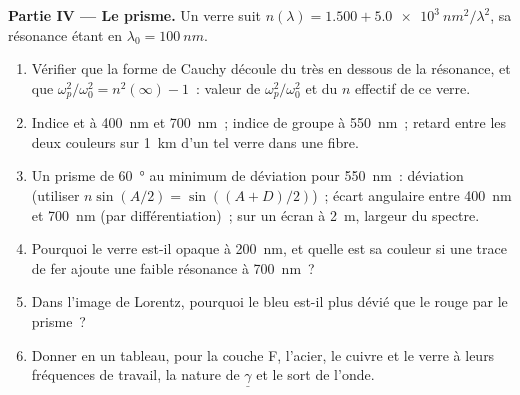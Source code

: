\begin{problem}
\medskip
\noindent\textbf{Partie IV --- Le prisme.}
Un verre suit $n(\lambda) = 1.500 + \qty{5.0e3}{nm^2}/\lambda^2$, sa résonance étant
en $\lambda_0 = \qty{100}{nm}$.
\begin{enumerate}[resume]
  \item Vérifier que la forme de Cauchy découle du  très
        en dessous de la résonance, et que $\omega_p^2/\omega_0^2 = n^2(\infty) - 1$~: valeur
        de $\omega_p^2/\omega_0^2$ et du $n$ effectif de ce verre.
  \item Indice et  à \qty{400}{nm} et \qty{700}{nm}~; indice de
        groupe à \qty{550}{nm}~; retard entre les deux couleurs sur
        \qty{1}{km} d'un tel verre dans une fibre.
  \item Un prisme de \qty{60}{\degree} au minimum de déviation pour \qty{550}{nm}~:
        déviation (utiliser $n\sin(A/2) = \sin((A + D)/2)$)~; écart angulaire
        entre \qty{400}{nm} et \qty{700}{nm} (par différentiation)~; sur un écran à
        \qty{2}{m}, largeur du spectre.
  \item Pourquoi le verre est-il opaque à \qty{200}{nm}, et quelle est sa
        couleur si une trace de fer ajoute une faible résonance à \qty{700}{nm}~?
  \item Dans l'image de Lorentz, pourquoi le bleu est-il plus dévié que le rouge par
        le prisme~?
  \item Donner en un tableau, pour la couche F, l'acier, le cuivre et
        le verre à leurs fréquences de travail, la nature de
        $\underline\gamma$ et le sort de l'onde.
\end{enumerate}
\end{problem}
